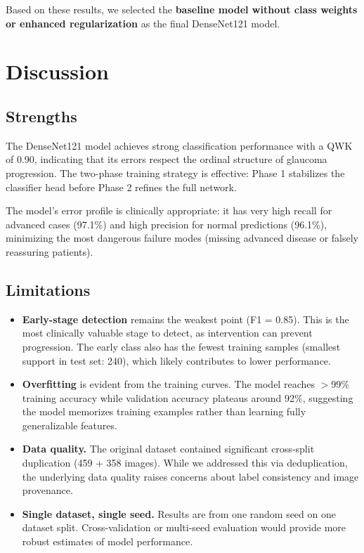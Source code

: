 \documentclass[conference]{IEEEtran}
\begin{document}
Based on these results, we selected the \textbf{baseline model without class weights or enhanced regularization} as the final DenseNet121 model.

\section{Discussion}
\label{sec:discussion}

\subsection{Strengths}

The DenseNet121 model achieves strong classification performance with a QWK of 0.90, indicating that its errors respect the ordinal structure of glaucoma progression.
The two-phase training strategy is effective: Phase 1 stabilizes the classifier head before Phase 2 refines the full network.

The model's error profile is clinically appropriate: it has very high recall for advanced cases (97.1\%) and high precision for normal predictions (96.1\%), minimizing the most dangerous failure modes (missing advanced disease or falsely reassuring patients).

\subsection{Limitations}

\begin{itemize}
    \item \textbf{Early-stage detection} remains the weakest point (F1 = 0.85). This is the most clinically valuable stage to detect, as intervention can prevent progression. The early class also has the fewest training samples (smallest support in test set: 240), which likely contributes to lower performance.
    \item \textbf{Overfitting} is evident from the training curves. The model reaches $>$99\% training accuracy while validation accuracy plateaus around 92\%, suggesting the model memorizes training examples rather than learning fully generalizable features.
    \item \textbf{Data quality.} The original dataset contained significant cross-split duplication (459 + 358 images). While we addressed this via deduplication, the underlying data quality raises concerns about label consistency and image provenance.
    \item \textbf{Single dataset, single seed.} Results are from one random seed on one dataset split. Cross-validation or multi-seed evaluation would provide more robust estimates of model performance.
\end{itemize}
\end{document}
